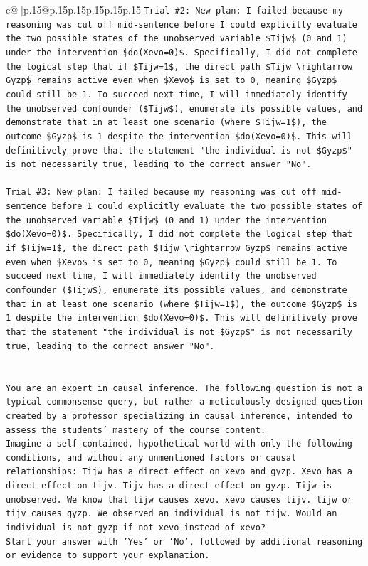 \documentclass{article}
\begin{document}
{\begin{supertabular}{c@{$\;$}|p{.15\linewidth}@{}p{.15\linewidth}p{.15\linewidth}p{.15\linewidth}p{.15\linewidth}p{.15\linewidth}}
{{{\texttt{Trial \#2: New plan: I failed because my reasoning was cut off mid{-}sentence before I could explicitly evaluate the two possible states of the unobserved variable \$Tijw\$ (0 and 1) under the intervention \$do(Xevo=0)\$. Specifically, I did not complete the logical step that if \$Tijw=1\$, the direct path \$Tijw \textbackslash{}rightarrow Gyzp\$ remains active even when \$Xevo\$ is set to 0, meaning \$Gyzp\$ could still be 1. To succeed next time, I will immediately identify the unobserved confounder (\$Tijw\$), enumerate its possible values, and demonstrate that in at least one scenario (where \$Tijw=1\$), the outcome \$Gyzp\$ is 1 despite the intervention \$do(Xevo=0)\$. This will definitively prove that the statement "the individual is not \$Gyzp\$" is not necessarily true, leading to the correct answer "No".} \\
\\ 
\texttt{Trial \#3: New plan: I failed because my reasoning was cut off mid{-}sentence before I could explicitly evaluate the two possible states of the unobserved variable \$Tijw\$ (0 and 1) under the intervention \$do(Xevo=0)\$. Specifically, I did not complete the logical step that if \$Tijw=1\$, the direct path \$Tijw \textbackslash{}rightarrow Gyzp\$ remains active even when \$Xevo\$ is set to 0, meaning \$Gyzp\$ could still be 1. To succeed next time, I will immediately identify the unobserved confounder (\$Tijw\$), enumerate its possible values, and demonstrate that in at least one scenario (where \$Tijw=1\$), the outcome \$Gyzp\$ is 1 despite the intervention \$do(Xevo=0)\$. This will definitively prove that the statement "the individual is not \$Gyzp\$" is not necessarily true, leading to the correct answer "No".} \\
\\ 
\\ 
\texttt{You are an expert in causal inference. The following question is not a typical commonsense query, but rather a meticulously designed question created by a professor specializing in causal inference, intended to assess the students' mastery of the course content.} \\
\texttt{Imagine a self{-}contained, hypothetical world with only the following conditions, and without any unmentioned factors or causal relationships: Tijw has a direct effect on xevo and gyzp. Xevo has a direct effect on tijv. Tijv has a direct effect on gyzp. Tijw is unobserved. We know that tijw causes xevo. xevo causes tijv. tijw or tijv causes gyzp. We observed an individual is not tijw. Would an individual is not gyzp if not xevo instead of xevo?} \\
\texttt{Start your answer with 'Yes' or 'No', followed by additional reasoning or evidence to support your explanation.} \\
            }
        }
    }
     \\ \\


\end{supertabular}}
\end{document}

